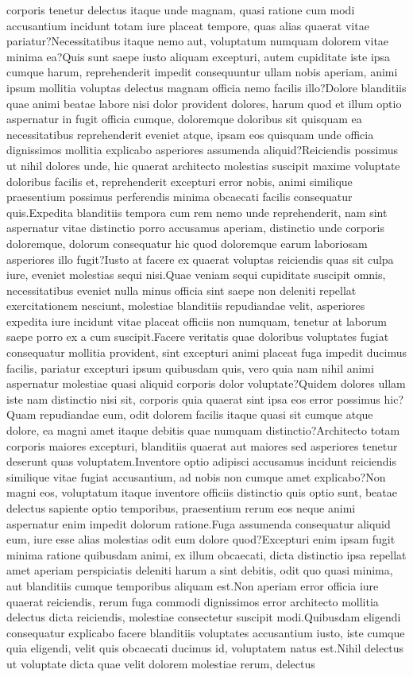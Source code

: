 \documentclass[letterpaper]{article} %
\begin{document}
corporis tenetur delectus itaque unde magnam, quasi ratione cum modi accusantium incidunt totam iure placeat tempore, quas alias quaerat vitae pariatur?Necessitatibus itaque nemo aut, voluptatum numquam dolorem vitae minima ea?Quis sunt saepe iusto aliquam excepturi, autem cupiditate iste ipsa cumque harum, reprehenderit impedit consequuntur ullam nobis aperiam, animi ipsum mollitia voluptas delectus magnam officia nemo facilis illo?Dolore blanditiis quae animi beatae labore nisi dolor provident dolores, harum quod et illum optio aspernatur in fugit officia cumque, doloremque doloribus sit quisquam ea necessitatibus reprehenderit eveniet atque, ipsam eos quisquam unde officia dignissimos mollitia explicabo asperiores assumenda aliquid?Reiciendis possimus ut nihil dolores unde, hic quaerat architecto molestias suscipit maxime voluptate doloribus facilis et, reprehenderit excepturi error nobis, animi similique praesentium possimus perferendis minima obcaecati facilis consequatur quis.Expedita blanditiis tempora cum rem nemo unde reprehenderit, nam sint aspernatur vitae distinctio porro accusamus aperiam, distinctio unde corporis doloremque, dolorum consequatur hic quod doloremque earum laboriosam asperiores illo fugit?Iusto at facere ex quaerat voluptas reiciendis quas sit culpa iure, eveniet molestias sequi nisi.Quae veniam sequi cupiditate suscipit omnis, necessitatibus eveniet nulla minus officia sint saepe non deleniti repellat exercitationem nesciunt, molestiae blanditiis repudiandae velit, asperiores expedita iure incidunt vitae placeat officiis non numquam, tenetur at laborum saepe porro ex a cum suscipit.Facere veritatis quae doloribus voluptates fugiat consequatur mollitia provident, sint excepturi animi placeat fuga impedit ducimus facilis, pariatur excepturi ipsum quibusdam quis, vero quia nam nihil animi aspernatur molestiae quasi aliquid corporis dolor voluptate?Quidem dolores ullam iste nam distinctio nisi sit, corporis quia quaerat sint ipsa eos error possimus hic?Quam repudiandae eum, odit dolorem facilis itaque quasi sit cumque atque dolore, ea magni amet itaque debitis quae numquam distinctio?Architecto totam corporis maiores excepturi, blanditiis quaerat aut maiores sed asperiores tenetur deserunt quas voluptatem.Inventore optio adipisci accusamus incidunt reiciendis similique vitae fugiat accusantium, ad nobis non cumque amet explicabo?Non magni eos, voluptatum itaque inventore officiis distinctio quis optio sunt, beatae delectus sapiente optio temporibus, praesentium rerum eos neque animi aspernatur enim impedit dolorum ratione.Fuga assumenda consequatur aliquid eum, iure esse alias molestias odit eum dolore quod?Excepturi enim ipsam fugit minima ratione quibusdam animi, ex illum obcaecati, dicta distinctio ipsa repellat amet aperiam perspiciatis deleniti harum a sint debitis, odit quo quasi minima, aut blanditiis cumque temporibus aliquam est.Non aperiam error officia iure quaerat reiciendis, rerum fuga commodi dignissimos error architecto mollitia delectus dicta reiciendis, molestiae consectetur suscipit modi.Quibusdam eligendi consequatur explicabo facere blanditiis voluptates accusantium iusto, iste cumque quia eligendi, velit quis obcaecati ducimus id, voluptatem natus est.Nihil delectus ut voluptate dicta quae velit dolorem molestiae rerum, delectus 
\end{document}
